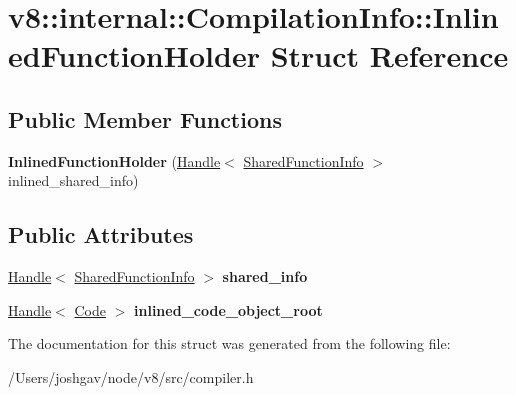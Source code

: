\hypertarget{structv8_1_1internal_1_1_compilation_info_1_1_inlined_function_holder}{}\section{v8\+:\+:internal\+:\+:Compilation\+Info\+:\+:Inlined\+Function\+Holder Struct Reference}
\label{structv8_1_1internal_1_1_compilation_info_1_1_inlined_function_holder}
\subsection*{Public Member Functions}
\begin{DoxyCompactItemize}
\item 
{\bfseries Inlined\+Function\+Holder} (\hyperlink{classv8_1_1internal_1_1_handle}{Handle}$<$ \hyperlink{classv8_1_1internal_1_1_shared_function_info}{Shared\+Function\+Info} $>$ inlined\+\_\+shared\+\_\+info)\hypertarget{structv8_1_1internal_1_1_compilation_info_1_1_inlined_function_holder_acf66b6aeb5b20bacfacd6b10d2c7acfe}{}\label{structv8_1_1internal_1_1_compilation_info_1_1_inlined_function_holder_acf66b6aeb5b20bacfacd6b10d2c7acfe}

\end{DoxyCompactItemize}
\subsection*{Public Attributes}
\begin{DoxyCompactItemize}
\item 
\hyperlink{classv8_1_1internal_1_1_handle}{Handle}$<$ \hyperlink{classv8_1_1internal_1_1_shared_function_info}{Shared\+Function\+Info} $>$ {\bfseries shared\+\_\+info}\hypertarget{structv8_1_1internal_1_1_compilation_info_1_1_inlined_function_holder_a2eeba7411bdc35b1fd4d4f69a05a93c7}{}\label{structv8_1_1internal_1_1_compilation_info_1_1_inlined_function_holder_a2eeba7411bdc35b1fd4d4f69a05a93c7}

\item 
\hyperlink{classv8_1_1internal_1_1_handle}{Handle}$<$ \hyperlink{classv8_1_1internal_1_1_code}{Code} $>$ {\bfseries inlined\+\_\+code\+\_\+object\+\_\+root}\hypertarget{structv8_1_1internal_1_1_compilation_info_1_1_inlined_function_holder_afd6af8695b401d947431ce750a3750c9}{}\label{structv8_1_1internal_1_1_compilation_info_1_1_inlined_function_holder_afd6af8695b401d947431ce750a3750c9}

\end{DoxyCompactItemize}


The documentation for this struct was generated from the following file\+:\begin{DoxyCompactItemize}
\item 
/\+Users/joshgav/node/v8/src/compiler.\+h\end{DoxyCompactItemize}
